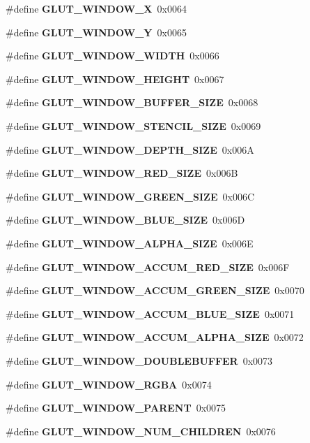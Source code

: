 \begin{DoxyCompactItemize}
\item 
\#define {\bf G\+L\+U\+T\+\_\+\+W\+I\+N\+D\+O\+W\+\_\+\+X}~0x0064
\item 
\#define {\bf G\+L\+U\+T\+\_\+\+W\+I\+N\+D\+O\+W\+\_\+\+Y}~0x0065
\item 
\#define {\bf G\+L\+U\+T\+\_\+\+W\+I\+N\+D\+O\+W\+\_\+\+W\+I\+D\+T\+H}~0x0066
\item 
\#define {\bf G\+L\+U\+T\+\_\+\+W\+I\+N\+D\+O\+W\+\_\+\+H\+E\+I\+G\+H\+T}~0x0067
\item 
\#define {\bf G\+L\+U\+T\+\_\+\+W\+I\+N\+D\+O\+W\+\_\+\+B\+U\+F\+F\+E\+R\+\_\+\+S\+I\+Z\+E}~0x0068
\item 
\#define {\bf G\+L\+U\+T\+\_\+\+W\+I\+N\+D\+O\+W\+\_\+\+S\+T\+E\+N\+C\+I\+L\+\_\+\+S\+I\+Z\+E}~0x0069
\item 
\#define {\bf G\+L\+U\+T\+\_\+\+W\+I\+N\+D\+O\+W\+\_\+\+D\+E\+P\+T\+H\+\_\+\+S\+I\+Z\+E}~0x006\+A
\item 
\#define {\bf G\+L\+U\+T\+\_\+\+W\+I\+N\+D\+O\+W\+\_\+\+R\+E\+D\+\_\+\+S\+I\+Z\+E}~0x006\+B
\item 
\#define {\bf G\+L\+U\+T\+\_\+\+W\+I\+N\+D\+O\+W\+\_\+\+G\+R\+E\+E\+N\+\_\+\+S\+I\+Z\+E}~0x006\+C
\item 
\#define {\bf G\+L\+U\+T\+\_\+\+W\+I\+N\+D\+O\+W\+\_\+\+B\+L\+U\+E\+\_\+\+S\+I\+Z\+E}~0x006\+D
\item 
\#define {\bf G\+L\+U\+T\+\_\+\+W\+I\+N\+D\+O\+W\+\_\+\+A\+L\+P\+H\+A\+\_\+\+S\+I\+Z\+E}~0x006\+E
\item 
\#define {\bf G\+L\+U\+T\+\_\+\+W\+I\+N\+D\+O\+W\+\_\+\+A\+C\+C\+U\+M\+\_\+\+R\+E\+D\+\_\+\+S\+I\+Z\+E}~0x006\+F
\item 
\#define {\bf G\+L\+U\+T\+\_\+\+W\+I\+N\+D\+O\+W\+\_\+\+A\+C\+C\+U\+M\+\_\+\+G\+R\+E\+E\+N\+\_\+\+S\+I\+Z\+E}~0x0070
\item 
\#define {\bf G\+L\+U\+T\+\_\+\+W\+I\+N\+D\+O\+W\+\_\+\+A\+C\+C\+U\+M\+\_\+\+B\+L\+U\+E\+\_\+\+S\+I\+Z\+E}~0x0071
\item 
\#define {\bf G\+L\+U\+T\+\_\+\+W\+I\+N\+D\+O\+W\+\_\+\+A\+C\+C\+U\+M\+\_\+\+A\+L\+P\+H\+A\+\_\+\+S\+I\+Z\+E}~0x0072
\item 
\#define {\bf G\+L\+U\+T\+\_\+\+W\+I\+N\+D\+O\+W\+\_\+\+D\+O\+U\+B\+L\+E\+B\+U\+F\+F\+E\+R}~0x0073
\item 
\#define {\bf G\+L\+U\+T\+\_\+\+W\+I\+N\+D\+O\+W\+\_\+\+R\+G\+B\+A}~0x0074
\item 
\#define {\bf G\+L\+U\+T\+\_\+\+W\+I\+N\+D\+O\+W\+\_\+\+P\+A\+R\+E\+N\+T}~0x0075
\item 
\#define {\bf G\+L\+U\+T\+\_\+\+W\+I\+N\+D\+O\+W\+\_\+\+N\+U\+M\+\_\+\+C\+H\+I\+L\+D\+R\+E\+N}~0x0076

\end{DoxyCompactItemize}
